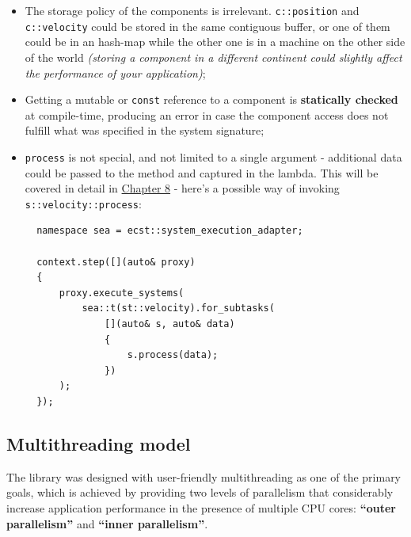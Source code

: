 \documentclass[twoside, 12pt, a4paper, openright]{book}
\begin{document}
\begin{itemize}
\item
  The storage policy of the components is irrelevant.
  \texttt{c::position}
  and
  \texttt{c::velocity}
  could be stored in the same contiguous buffer, or one of them could be
  in an hash-map while the other one is in a machine on the other side
  of the world \emph{(storing a component in a different continent could
  slightly affect the performance of your application)};
\item
  Getting a mutable or
  \texttt{const}
  reference to a component is \textbf{statically checked} at
  compile-time, producing an error in case the component access does not
  fulfill what was specified in the system signature;
\item
  \texttt{process}
  is not special, and not limited to a single argument - additional data
  could be passed to the method and captured in the lambda. This will be
  covered in detail in \protect\hyperlink{chap_flow}{Chapter 8} - here's
  a possible way of invoking
  \texttt{s::velocity::process}:

  \begin{verbatim}
  namespace sea = ecst::system_execution_adapter;

  context.step([](auto& proxy)
  {
      proxy.execute_systems(
          sea::t(st::velocity).for_subtasks(
              [](auto& s, auto& data)
              {
                  s.process(data);
              })
      );
  });
  \end{verbatim}
\end{itemize}

\subsection{Multithreading model}\label{multithreading-model}

The library was designed with user-friendly multithreading as one of the
primary goals, which is achieved by providing two levels of parallelism
that considerably increase application performance in the presence of
multiple CPU cores: \textbf{``outer parallelism''} and \textbf{``inner
parallelism''}.
\end{document}
